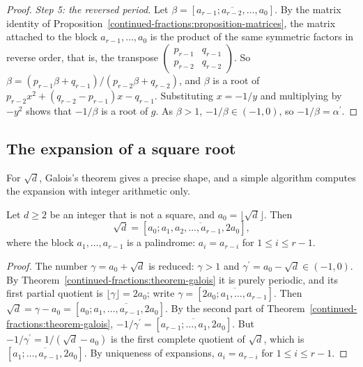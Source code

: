 \begin{proof}
\emph{Step 5: the reversed period.} Let $\beta = [\overline{a_{r-1}; a_{r-2}, \ldots, a_0}]$. By the matrix identity of Proposition~\ref{continued-fractions:proposition-matrices}, the matrix attached to
the block $a_{r-1}, \ldots, a_0$ is the product of the same symmetric factors in reverse order, that is, the transpose $\begin{pmatrix} p_{r-1} & q_{r-1}\\ p_{r-2} & q_{r-2}\end{pmatrix}$. So
$\beta = (p_{r-1}\beta + q_{r-1})/(p_{r-2}\beta + q_{r-2})$, and $\beta$ is a root of $p_{r-2}x^2 + (q_{r-2} - p_{r-1})x - q_{r-1}$. Substituting $x = -1/y$ and multiplying by $-y^2$ shows that
$-1/\beta$ is a root of $g$. As $\beta > 1$, $-1/\beta \in (-1, 0)$, so $-1/\beta = \alpha^{\prime}$.
\end{proof}

\subsection{The expansion of a square root}\label{continued-fractions:subsection-square-root}

For $\sqrt d$, Galois's theorem gives a precise shape, and a simple algorithm computes the expansion with integer arithmetic only.

\begin{corollary}\label{continued-fractions:corollary-sqrt}
Let $d \geq 2$ be an integer that is not a square, and $a_0 = \lfloor\sqrt d\rfloor$. Then
\[
\sqrt d = [a_0; \overline{a_1, a_2, \ldots, a_{r-1}, 2a_0}],
\]
where the block $a_1, \ldots, a_{r-1}$ is a palindrome: $a_i = a_{r-i}$ for $1 \leq i \leq r - 1$.
\end{corollary}

\begin{proof}
The number $\gamma = a_0 + \sqrt d$ is reduced: $\gamma > 1$ and $\gamma^{\prime} = a_0 - \sqrt d \in (-1, 0)$. By Theorem~\ref{continued-fractions:theorem-galois} it is purely periodic, and its first
partial quotient is $\lfloor\gamma\rfloor = 2a_0$; write $\gamma = [\overline{2a_0; a_1, \ldots, a_{r-1}}]$. Then $\sqrt d = \gamma - a_0 = [a_0; \overline{a_1, \ldots, a_{r-1}, 2a_0}]$. By
the second part of Theorem~\ref{continued-fractions:theorem-galois}, $-1/\gamma^{\prime} = [\overline{a_{r-1}; \ldots, a_1, 2a_0}]$. But $-1/\gamma^{\prime} = 1/(\sqrt d - a_0)$ is the first complete
quotient of $\sqrt d$, which is $[\overline{a_1; \ldots, a_{r-1}, 2a_0}]$. By uniqueness of expansions, $a_i = a_{r-i}$ for $1 \leq i \leq r - 1$.
\end{proof}

